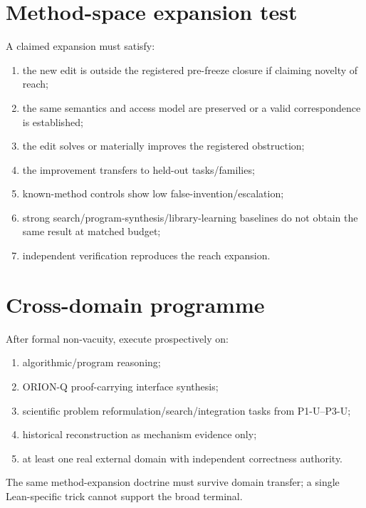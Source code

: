 \documentclass[11pt]{article}
\begin{document}
\section{Method-space expansion test}
A claimed expansion must satisfy:
\begin{enumerate}
    \item the new edit is outside the registered pre-freeze closure if claiming novelty of reach;
    \item the same semantics and access model are preserved or a valid correspondence is established;
    \item the edit solves or materially improves the registered obstruction;
    \item the improvement transfers to held-out tasks/families;
    \item known-method controls show low false-invention/escalation;
    \item strong search/program-synthesis/library-learning baselines do not obtain the same result at matched budget;
    \item independent verification reproduces the reach expansion.
\end{enumerate}

\section{Cross-domain programme}
After formal non-vacuity, execute prospectively on:
\begin{enumerate}
    \item algorithmic/program reasoning;
    \item ORION-Q proof-carrying interface synthesis;
    \item scientific problem reformulation/search/integration tasks from P1-U--P3-U;
    \item historical reconstruction as mechanism evidence only;
    \item at least one real external domain with independent correctness authority.
\end{enumerate}
The same method-expansion doctrine must survive domain transfer; a single Lean-specific trick cannot support the broad terminal.
\end{document}
